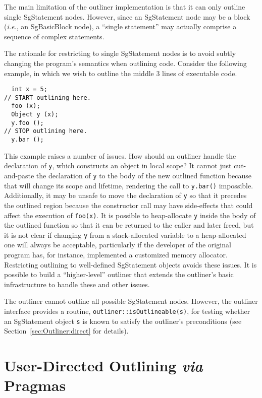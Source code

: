 The main limitation of the outliner implementation is that it can only
outline single SgStatement nodes. However, since an SgStatement node
may be a block (\emph{i.e.}, an SgBasicBlock node), a ``single
statement'' may actually comprise a sequence of complex statements.

The rationale for restricting to single SgStatement nodes is to avoid
subtly changing the program's semantics when outlining code. Consider
the following example, in which we wish to outline the middle 3 lines
of executable code.
%
\lstset{language=C++,numbers=left,firstnumber=1,stepnumber=2}
\begin{lstlisting}
  int x = 5;
// START outlining here.
  foo (x);
  Object y (x);
  y.foo ();
// STOP outlining here.
  y.bar ();
\end{lstlisting}
%
This example raises a number of issues. How should an outliner handle
the declaration of \texttt{y}, which constructs an object in local
scope? It cannot just cut-and-paste the declaration of \texttt{y} to
the body of the new outlined function because that will change its
scope and lifetime, rendering the call to \texttt{y.bar()}
impossible. Additionally, it may be unsafe to move the declaration of
\texttt{y} so that it precedes the outlined region because the
constructor call may have side-effects that could affect the execution
of \texttt{foo(x)}. It is possible to heap-allocate \texttt{y} inside
the body of the outlined function so that it can be returned to the
caller and later freed, but it is not clear if changing \texttt{y}
from a stack-allocated variable to a heap-allocated one will always be
acceptable, particularly if the developer of the original program has,
for instance, implemented a customized memory allocator. Restricting
outlining to well-defined SgStatement objects avoids these issues.  It
is possible to build a ``higher-level'' outliner that extends the
outliner's basic infrastructure to handle these and other issues.

The outliner cannot outline all possible SgStatement nodes.
However, the outliner interface provides a routine,
\texttt{outliner::isOutlineable(s)}, for testing whether an
SgStatement object \texttt{s} is known to satisfy the outliner's
preconditions (see Section~\ref{sec:Outliner:direct} for details).

\section{User-Directed Outlining \emph{via} Pragmas}
\label{sec:Outliner:basic}

